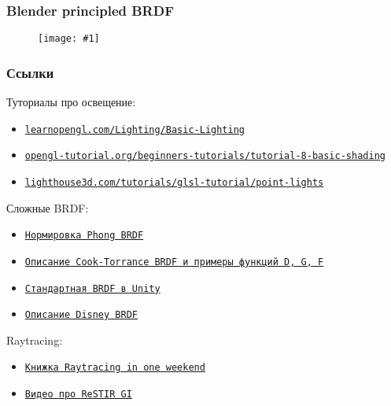 \documentclass{beamer}
\newcommand{\slideimage}[1]{
  \begin{figure}
    \begin{adjustbox}{width=\textwidth, totalheight=\textheight-2\baselineskip-2\baselineskip,keepaspectratio}
      \texttt{[image: \#1]}
    \end{adjustbox}
  \end{figure}
}
\begin{document}
\begin{frame}[fragile]
\frametitle{Blender principled BRDF}
\slideimage{principled.png}
\end{frame}

\begin{frame}[fragile]
\frametitle{Ссылки}
\fontsize{8pt}{8pt}
Туториалы про освещение:
\begin{itemize}
\item \href{https://learnopengl.com/Lighting/Basic-Lighting}{\texttt{learnopengl.com/Lighting/Basic-Lighting}}
\item \href{http://www.opengl-tutorial.org/beginners-tutorials/tutorial-8-basic-shading}{\texttt{opengl-tutorial.org/beginners-tutorials/tutorial-8-basic-shading}}
\item \href{https://www.lighthouse3d.com/tutorials/glsl-tutorial/point-lights}{\texttt{lighthouse3d.com/tutorials/glsl-tutorial/point-lights}}
\end{itemize}
Сложные BRDF:
\begin{itemize}
\item \href{http://www.cemyuksel.com/research/papers/CGI2020_ConstantTimeEnergyNormalizationForThePhongSpecularBRDFs.pdf}{\texttt{Нормировка Phong BRDF}}
\item \href{https://graphicscompendium.com/references/cook-torrance}{\texttt{Описание Cook-Torrance BRDF и примеры функций D, G, F}}
\item \href{https://github.com/TwoTailsGames/Unity-Built-in-Shaders/blob/master/CGIncludes/UnityStandardBRDF.cginc}{\texttt{Стандартная BRDF в Unity}}
\item \href{https://blog.selfshadow.com/publications/s2012-shading-course/burley/s2012_pbs_disney_brdf_notes_v3.pdf}{\texttt{Описание Disney BRDF}}
\end{itemize}
Raytracing:
\begin{itemize}
\item \href{https://raytracing.github.io/books/RayTracingInOneWeekend.html}{\texttt{Книжка Raytracing in one weekend}}
\item \href{https://www.youtube.com/watch?v=gsZiJeaMO48}{\texttt{Видео про ReSTIR GI}}
\end{itemize}
\end{frame}
\end{document}
